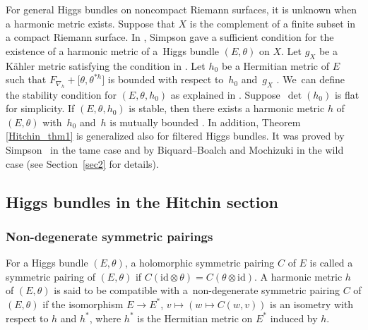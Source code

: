 \documentclass[pdftex]{sigma}
\numberwithin{equation}{section}
\newcommand{\id}{\mathrm{id}}
\begin{document}
For general Higgs bundles on noncompact Riemann surfaces, it is unknown when a harmonic metric exists.
Suppose that $X$ is the complement of a finite subset in a compact Riemann surface. In \cite{Si1}, Simpson gave a sufficient condition for the existence of a harmonic metric of a~Higgs bundle $(E,\theta)$ on $X$. Let $g_X$ be a K\"{a}hler metric satisfying the condition in \cite[Proposition~2.4]{Si1}. Let $h_0$ be a Hermitian metric of $E$ such that $F_{\nabla_{h}} + \bigl[\theta, \theta^{\ast h}\bigr]$ is bounded with respect to~$h_0$ and~$g_X$ . We~can define the stability condition for $(E,\theta, h_0)$ as explained in \cite[Section 3]{Si1}. Suppose~$\det(h_0)$ is flat for simplicity. If $(E,\theta, h_0)$ is stable, then there exists a harmonic metric $h$ of $(E,\theta)$ with~$h_0$ and~$h$ is mutually bounded \cite[Theorem 1]{Si1}. In addition, Theorem \ref{Hitchin_thm1} is generalized also for filtered Higgs bundles. It was proved by Simpson~\cite{Si2} in the tame case and by Biquard--Boalch \cite{BB} and Mochizuki \cite{Mo1} in the wild case (see Section~\ref{sec2} for details).

\subsection{Higgs bundles in the Hitchin section}
\subsubsection{Non-degenerate symmetric pairings}
For a Higgs bundle $(E,\theta)$, a holomorphic symmetric pairing $C$ of $E$ is called a symmetric pairing of $(E,\theta)$ if $C(\id\otimes\theta) = C(\theta\otimes \id)$. A harmonic metric $h$ of $(E,\theta)$ is said to be compatible with a~non-degenerate symmetric pairing $C$ of $(E,\theta)$ if the isomorphism $E\to E^{*}$, $v\mapsto (w\mapsto C(w,v))$ is an isometry with respect to $h$ and $h^{*}$, where $h^{*}$ is the Hermitian metric on $E^{*}$ induced by $h$.
\end{document}
